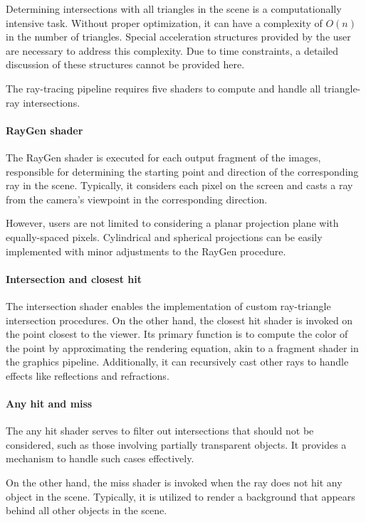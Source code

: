 Determining intersections with all triangles in the scene is a computationally intensive task. 
Without proper optimization, it can have a complexity of $O(n)$ in the number of triangles. 
Special acceleration structures provided by the user are necessary to address this complexity. 
Due to time constraints, a detailed discussion of these structures cannot be provided here.

The ray-tracing pipeline requires five shaders to compute and handle all triangle-ray intersections.

\paragraph*{RayGen shader}
The RayGen shader is executed for each output fragment of the images, responsible for determining the starting point and direction of the corresponding ray in the scene. 
Typically, it considers each pixel on the screen and casts a ray from the camera's viewpoint in the corresponding direction.

However, users are not limited to considering a planar projection plane with equally-spaced pixels. 
Cylindrical and spherical projections can be easily implemented with minor adjustments to the RayGen procedure.

\paragraph*{Intersection and closest hit}
The intersection shader enables the implementation of custom ray-triangle intersection procedures. 
On the other hand, the closest hit shader is invoked on the point closest to the viewer. 
Its primary function is to compute the color of the point by approximating the rendering equation, akin to a fragment shader in the graphics pipeline.
Additionally, it can recursively cast other rays to handle effects like reflections and refractions.

\paragraph*{Any hit and miss}
The any hit shader serves to filter out intersections that should not be considered, such as those involving partially transparent objects. 
It provides a mechanism to handle such cases effectively.

On the other hand, the miss shader is invoked when the ray does not hit any object in the scene. 
Typically, it is utilized to render a background that appears behind all other objects in the scene.

